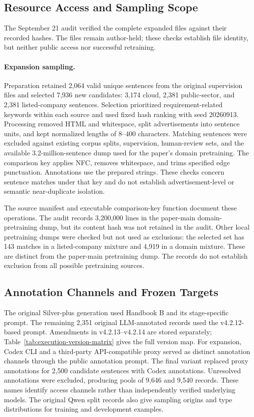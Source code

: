 \subsection{Resource Access and Sampling Scope}
\label{sec:resource-access}

The September 21 audit verified the complete expanded files against their recorded hashes. The files remain author-held; these checks establish file identity, but neither public access nor successful retraining.


\paragraph{Expansion sampling.}
Preparation retained 2,064 valid unique sentences from the original supervision files and selected 7,936 new candidates: 3,174 cloud, 2,381 public-sector, and 2,381 listed-company sentences. Selection prioritized requirement-related keywords within each source and used fixed hash ranking with seed 20260913. Processing removed HTML and whitespace, split advertisements into sentence units, and kept normalized lengths of 8--400 characters. Matching sentences were excluded against existing corpus splits, supervision, human-review sets, and the available 3.2-million-sentence dump used for the paper's domain pretraining. The comparison key applies NFC, removes whitespace, and trims specified edge punctuation. Annotations use the prepared strings. These checks concern sentence matches under that key and do not establish advertisement-level or semantic near-duplicate isolation.

The source manifest and executable comparison-key function document these operations. The audit records 3,200,000 lines in the paper-main domain-pretraining dump, but its content hash was not retained in the audit. Other local pretraining dumps were checked but not used as exclusions: the selected set has 143 matches in a listed-company mixture and 4,919 in a domain mixture. These are distinct from the paper-main pretraining dump. The records do not establish exclusion from all possible pretraining sources.



\subsection{Annotation Channels and Frozen Targets}
The original Silver-plus generation used Handbook B and its stage-specific prompt. The remaining 2,351 original LLM-annotated records used the v4.2.12-based prompt. Amendments in v4.2.13--v4.2.14 are stored separately; Table~\ref{tab:execution-version-matrix} gives the full version map. For expansion, Codex CLI and a third-party API-compatible proxy served as distinct annotation channels through the public annotation prompt. The final variant replaced proxy annotations for 2,500 candidate sentences with Codex annotations. Unresolved annotations were excluded, producing pools of 9,646 and 9,540 records. These names identify access channels rather than independently verified underlying models. The original Qwen split records also give sampling origins and type distributions for training and development examples.

